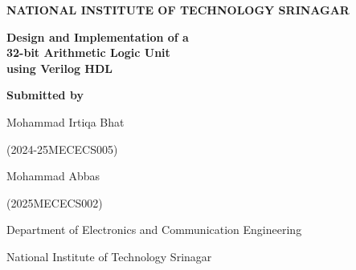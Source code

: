 \documentclass[11pt,a4paper]{article}
\begin{document}
\begin{titlepage}
\centering
{\large\bfseries NATIONAL INSTITUTE OF TECHNOLOGY SRINAGAR\par}
\vspace{0.3cm}{\large Department of Electronics and Communication Engineering\par}
\vspace{2.5cm}
{\LARGE\bfseries Design and Implementation of a\\32-bit Arithmetic Logic Unit\\using Verilog HDL\par}
\vspace{0.8cm}{\large Mini Project Report\par}
\vspace{3cm}
{\large\bfseries Submitted by\par}\vspace{0.4cm}
{\large Mohammad Irtiqa Bhat\par (2024-25MECECS005)\par}\vspace{0.3cm}
{\large Mohammad Abbas\par (2025MECECS002)\par}
\vfill
{\large Department of Electronics and Communication Engineering\par
National Institute of Technology Srinagar\par}
\vspace{0.5cm}{\large 2026\par}
\end{titlepage}

\begin{abstract}
This report presents the design, implementation and verification of a 32-bit Arithmetic Logic Unit (ALU) in Verilog HDL. The ALU performs sixteen arithmetic, logic, shift and compare operations and produces four status flags: Zero, Negative, Carry and Overflow. The adder is built structurally from eight 4-bit carry-lookahead blocks, shifting is done by a five-stage barrel shifter, and the compare operations re-use the subtractor so that no separate comparator is needed. The design is verified with self-checking testbenches that combine an independent behavioural reference model, directed corner-case tests, constrained-random tests and golden vectors generated by a Python model. Yosys scripts are provided for generic gate-level and Lattice ECP5 synthesis.
\end{abstract}

\tableofcontents
\newpage
\end{document}

